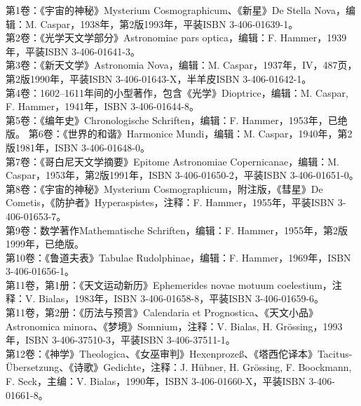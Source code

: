 第1卷：《宇宙的神秘》Mysterium Cosmographicum、《新星》De Stella Nova，编辑：M. Caspar，1938年，第2版1993年，平装ISBN 3-406-01639-1。\\
第2卷：《光学天文学部分》Astronomiae pars optica，编辑：F. Hammer，1939年，平装ISBN 3-406-01641-3。\\
第3卷：《新天文学》Astronomia Nova，编辑：M. Caspar，1937年，IV，487页，第2版1990年，平装ISBN 3-406-01643-X，半羊皮ISBN 3-406-01642-1。\\
第4卷：1602–1611年间的小型著作，包含《光学》Dioptrice，编辑：M. Caspar, F. Hammer，1941年，ISBN 3-406-01644-8。\\
第5卷：《编年史》Chronologische Schriften，编辑：F. Hammer，1953年，已绝版。
第6卷：《世界的和谐》Harmonice Mundi，编辑：M. Caspar，1940年，第2版1981年，ISBN 3-406-01648-0。\\
第7卷：《哥白尼天文学摘要》Epitome Astronomiae Copernicanae，编辑：M. Caspar，1953年，第2版1991年，ISBN 3-406-01650-2，平装ISBN 3-406-01651-0。\\
第8卷：《宇宙的神秘》Mysterium Cosmographicum，附注版，《彗星》De Cometis，《防护者》Hyperaspistes，注释：F. Hammer，1955年，平装ISBN 3-406-01653-7。\\
第9卷：数学著作Mathematische Schriften，编辑：F. Hammer，1955年，第2版1999年，已绝版。\\
第10卷：《鲁道夫表》Tabulae Rudolphinae，编辑：F. Hammer，1969年，ISBN 3-406-01656-1。\\
第11卷，第1册：《天文运动新历》Ephemerides novae motuum coelestium，注释：V. Bialas，1983年，ISBN 3-406-01658-8，平装ISBN 3-406-01659-6。\\
第11卷，第2册：《历法与预言》Calendaria et Prognostica、《天文小品》Astronomica minora、《梦境》Somnium，注释：V. Bialas, H. Grössing，1993年，ISBN 3-406-37510-3，平装ISBN 3-406-37511-1。\\
第12卷：《神学》Theologica、《女巫审判》Hexenprozeß、《塔西佗译本》Tacitus-Übersetzung、《诗歌》Gedichte，注释：J. Hübner, H. Grössing, F. Boockmann, F. Seck，主编：V. Bialas，1990年，ISBN 3-406-01660-X，平装ISBN 3-406-01661-8。\\
